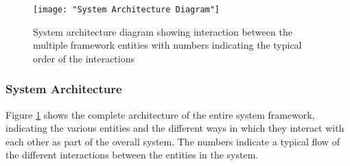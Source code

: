 \begin{figure}[h]
	\centering
	\texttt{[image: "System Architecture Diagram"]}
	\caption{System architecture diagram showing interaction between the multiple framework entities with numbers indicating the typical order of the interactions}
	\label{fig:sysarch}
\end{figure}

\subsubsection*{System Architecture}

Figure \ref{fig:sysarch} shows the complete architecture of the entire system framework, indicating the various entities and the different ways in which they interact with each other as part of the overall system. The numbers indicate a typical flow of the different interactions between the entities in the system.

